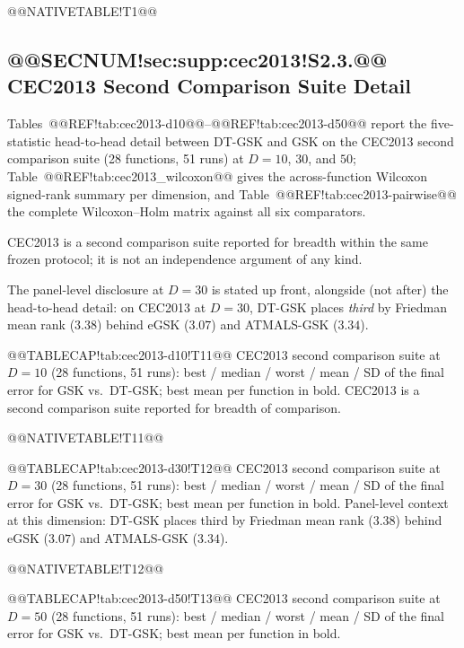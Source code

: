 \documentclass[10pt,a4paper]{article}
\newcommand{\dtgsk}{DT-GSK}
\newcommand{\atmals}{ATMALS-GSK}
\newcommand{\egsk}{eGSK}
\begin{document}
@@NATIVETABLE!T1@@



\subsection{@@SECNUM!sec:supp:cec2013!S2.3.@@ CEC2013 Second Comparison Suite Detail}\label{sec:supp:cec2013}

Tables~@@REF!tab:cec2013-d10@@--@@REF!tab:cec2013-d50@@ report the
five-statistic head-to-head detail between \dtgsk{} and GSK on the
CEC2013 second comparison suite (28 functions, 51 runs) at $D = 10$,
$30$, and $50$; Table~@@REF!tab:cec2013\_wilcoxon@@ gives the
across-function Wilcoxon signed-rank summary per dimension, and
Table~@@REF!tab:cec2013-pairwise@@ the complete Wilcoxon--Holm matrix
against all six comparators.

CEC2013 is a second comparison suite reported for breadth within the
same frozen protocol; it is not an independence argument of any kind.

The panel-level disclosure at $D = 30$ is stated up front, alongside
(not after) the head-to-head detail: on CEC2013 at $D = 30$,
\dtgsk{} places \emph{third} by Friedman mean rank ($3.38$) behind
\egsk{} ($3.07$) and \atmals{} ($3.34$).




@@TABLECAP!tab:cec2013-d10!T11@@ CEC2013 second comparison suite at $D = 10$ (28 functions,
51 runs): best / median / worst / mean / SD of the final error for GSK
vs.\ \dtgsk{}; best mean per function in bold.  CEC2013 is a second
comparison suite reported for breadth of comparison.

@@NATIVETABLE!T11@@





@@TABLECAP!tab:cec2013-d30!T12@@ CEC2013 second comparison suite at $D = 30$ (28 functions,
51 runs): best / median / worst / mean / SD of the final error for GSK
vs.\ \dtgsk{}; best mean per function in bold.  Panel-level context at
this dimension: \dtgsk{} places third by Friedman mean rank ($3.38$)
behind \egsk{} ($3.07$) and \atmals{} ($3.34$).

@@NATIVETABLE!T12@@





@@TABLECAP!tab:cec2013-d50!T13@@ CEC2013 second comparison suite at $D = 50$ (28 functions,
51 runs): best / median / worst / mean / SD of the final error for GSK
vs.\ \dtgsk{}; best mean per function in bold.
\end{document}

